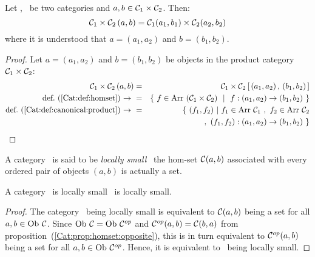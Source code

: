 \begin{prop}\label{Cat:prop:homset:product}
    Let \Cone, \Ctwo\ be two categories and $a,b\in\mbox{${\cal C}_{1}$}\times\mbox{${\cal C}_{2}$}$. Then:
        \[
            \mbox{${\cal C}_{1}$}\times\mbox{${\cal C}_{2}$}\,(a,b) 
            = 
            \mbox{${\cal C}_{1}$}(a_{1},b_{1})\times\mbox{${\cal C}_{2}$}(a_{2},b_{2})
        \]
    where it is understood that $a=(a_{1},a_{2})$ and $b=(b_{1},b_{2})$.
\end{prop}
\begin{proof}
    Let $a=(a_{1},a_{2})$ and $b=(b_{1},b_{2})$ be objects in the
    product category $\mbox{${\cal C}_{1}$}\times\mbox{${\cal C}_{2}$}$:
    \begin{eqnarray*}\Cone\times\Ctwo\,(a,b) 
        &=&\Cone\times\Ctwo\,[\,(a_{1},a_{2})\,,\,(b_{1},b_{2})\,]\\
        \mbox{def.~(\ref{Cat:def:homset})\ $\to$\ }
        &=&\{\ f\in\arr\ (\Cone\times\Ctwo)\ \ |\ \ 
               f : (a_{1},a_{2})\to(b_{1},b_{2})\ \}\\
        \mbox{def.~(\ref{Cat:def:canonical:product})\ $\to$\ }
        &=&\{\ (f_{1},f_{2})\ |\ f_{1}\in\arr\ \Cone\ ,\ f_{2}\in\arr\ \Ctwo\\
        &\ &\,,\ (f_{1},f_{2}) : (a_{1},a_{2})\to(b_{1},b_{2})\ \}
    \end{eqnarray*}
\end{proof}

\begin{defin}\label{Cat:def:locally:small}
    A category \Cat\ is said to be {\em locally small} \ifand\ the hom-set
    $\mbox{$\cal C$}(a,b)$ associated with every ordered pair of objects $(a,b)$ is 
    actually a set.
\end{defin}

\begin{prop}\label{Cat:def:locally:small:opposite}
    A category \Cat\ is locally small \ifand\ \Cop is locally small.
\end{prop}
\begin{proof}
    The category \Cat\ being locally small is equivalent to $\mbox{$\cal C$}(a,b)$
    being a set for all $a,b\in\mbox{\rm Ob}\ \mbox{$\cal C$}$. Since $\mbox{\rm Ob}\ \mbox{$\cal C$}=\mbox{\rm Ob}\ \mbox{${\cal C}^{op}$}$
    and $\mbox{${\cal C}^{op}$}(a,b)=\mbox{$\cal C$}(b,a)$ from 
    proposition~(\ref{Cat:prop:homset:opposite}), this is in turn equivalent 
    to $\mbox{${\cal C}^{op}$}(a,b)$ being a set for all $a,b\in\mbox{\rm Ob}\ \mbox{${\cal C}^{op}$}$. Hence, it is
    equivalent to \Cop\ being locally small.
\end{proof}
